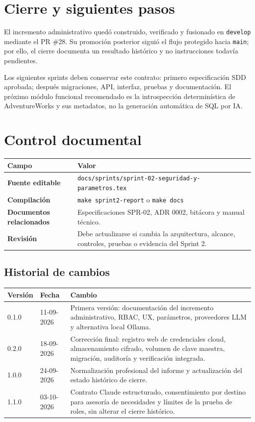 \documentclass[11pt,letterpaper]{article}
\newcommand{\file}[1]{\texttt{#1}}
\begin{document}
\section{Cierre y siguientes pasos}

El incremento administrativo quedó construido, verificado y fusionado en \file{develop} mediante el PR \#28. Su promoción posterior siguió el flujo protegido hacia \file{main}; por ello, el cierre documenta un resultado histórico y no instrucciones todavía pendientes.

Los siguientes sprints deben conservar este contrato: primero especificación SDD aprobada; después migraciones, API, interfaz, pruebas y documentación. El próximo módulo funcional recomendado es la introspección determinística de AdventureWorks y sus metadatos, no la generación automática de SQL por IA.

\section{Control documental}

\begin{tabularx}{\textwidth}{@{}>{\bfseries}p{}X@{}}
  \toprule
  Campo & Valor \\
  \midrule
  Fuente editable & \file{docs/sprints/sprint-02-seguridad-y-parametros.tex} \\
  Compilación & \file{make sprint2-report} o \file{make docs} \\
  Documentos relacionados & Especificaciones SPR-02, ADR 0002, bitácora y manual técnico. \\
  Revisión & Debe actualizarse si cambia la arquitectura, alcance, controles, pruebas o evidencia del Sprint 2. \\
  \bottomrule
\end{tabularx}

\subsection*{Historial de cambios}

\begin{tabularx}{\textwidth}{@{}l l X@{}}
  \toprule
  Versión & Fecha & Cambio \\
  \midrule
  0.1.0 & 11-09-2026 & Primera versión: documentación del incremento administrativo, RBAC, UX, parámetros, proveedores LLM y alternativa local Ollama. \\
  0.2.0 & 18-09-2026 & Corrección final: registro web de credenciales cloud, almacenamiento cifrado, volumen de clave maestra, migración, auditoría y verificación integrada. \\
  1.0.0 & 24-09-2026 & Normalización profesional del informe y actualización del estado histórico de cierre. \\
  1.1.0 & 03-10-2026 & Contrato Claude estructurado, consentimiento por destino para asesoría de necesidades y límites de la prueba de roles, sin alterar el cierre histórico. \\
  \bottomrule
\end{tabularx}
\end{document}
